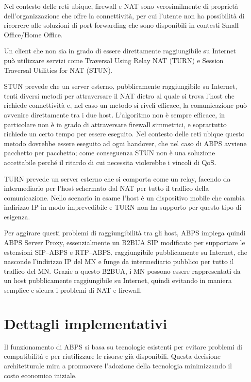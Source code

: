 \documentclass[12pt,a4paper,openright,twoside]{book}
\begin{document}
Nel contesto delle reti ubique, firewall e NAT sono verosimilmente di
proprietà dell'organizzazione che offre la connettività, per cui
l'utente non ha possibilità di ricorrere alle soluzioni di
port-forwarding che sono disponibili in contesti Small Office/Home
Office.

Un client che non sia in grado di essere direttamente raggiungibile su
Internet può utilizzare servizi come Traversal Using Relay NAT (TURN)
e Session Traversal Utilities for NAT (STUN).

STUN prevede che un server esterno, pubblicamente raggiungibile su
Internet, tenti diversi metodi per attraversare il NAT dietro al quale
si trova l'host che richiede connettività e, nel caso un metodo si
riveli efficace, la comunicazione può avvenire direttamente tra i due
host. L'algoritmo non è sempre efficace, in particolare non è in grado
di attraversare firewall simmetrici, e soprattutto richiede un certo
tempo per essere eseguito. Nel contesto delle reti ubique questo
metodo dovrebbe essere eseguito ad ogni handover, che nel caso di ABPS
avviene pacchetto per pacchetto; come conseguenza STUN non è una
soluzione accettabile perché il ritardo di cui necessita violerebbe i
vincoli di QoS.

TURN prevede un server esterno che si comporta come un relay, facendo
da intermediario per l'host schermato dal NAT per tutto il traffico
della comunicazione. Nello scenario in esame l'host è un dispositivo
mobile che cambia indirizzo IP in modo imprevedibile e TURN non ha
supporto per questo tipo di esigenza.

Per aggirare questi problemi di raggiungibilità tra gli host, ABPS
impiega quindi ABPS Server Proxy, essenzialmente un B2BUA SIP
modificato per supportare le estensioni SIP--ABPS e RTP--ABPS,
raggiungibile pubblicamente su Internet, che nasconde l'indirizzo IP
del MN e funge da intermediario pubblico per tutto il traffico del
MN. Grazie a questo B2BUA, i MN possono essere rappresentati da un
host pubblicamente raggiungibile su Internet, quindi evitando in
maniera semplice e sicura i problemi di NAT e firewall.

\section{Dettagli implementativi}

Il funzionamento di ABPS si basa su tecnologie esistenti per evitare
problemi di compatibilità e per riutilizzare le risorse già
disponibili. Questa decisione architetturale mira a promuovere
l'adozione della tecnologia minimizzando il costo economico iniziale.
\end{document}
